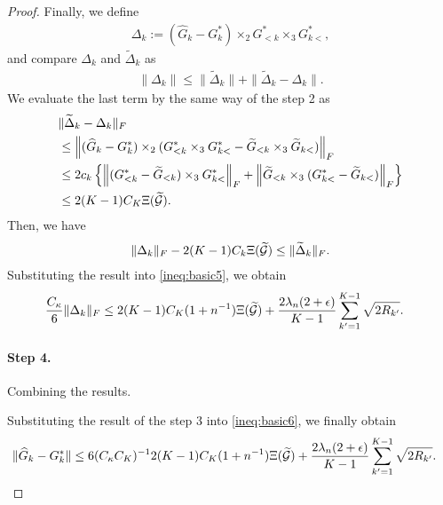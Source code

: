 \begin{proof}
Finally, we define
\begin{align*}
	\Delta_k := (\hat{G}_k - G_k^*) \times_2 G_{<k}^* \times_3 G_{k<}^*,
\end{align*}
and compare $\Delta_k$ and $\tilde{\Delta}_k$ as
\begin{align*}
	\|\Delta_k\| \leq \|\tilde{\Delta}_k\| + \|\tilde{\Delta}_k - \Delta_k\|.
\end{align*}
We evaluate the last term by the same way of the step 2 as
\begin{align*}
	&\|\widetilde{\Delta}_k - \Delta_k\|_F \\
	& \leq \left\| (\widehat{G}_k - G_k^*) \times_2 (G_{<k}^* \times_3 G_{k<}^* - \widetilde{G}_{<k} \times_3 \widetilde{G}_{k<})\right\|_F \\
	& \leq 2 c_k \left\{\left\| (G_{<k}^* - \widetilde{G}_{<k} ) \times_3 G_{k<}^*\right\|_F + \left\| \widetilde{G}_{<k} \times_3 ( G_{k<}^* -  \widetilde{G}_{k<})\right\|_F  \right\} \\
	& \leq 2 (K-1) C_K \Xi(\widetilde{\mathcal{G}}).
\end{align*}
Then, we have
\begin{align*}
	\|\Delta_k\|_F - 2 (K-1) C_k\Xi(\widetilde{\mathcal{G}}) \leq  \|\widetilde{\Delta}_k\|_F.
\end{align*}
Substituting the result into \eqref{ineq:basic5}, we obtain
\begin{align}
	&\frac{C_{\kappa}}{6} \|\Delta_k\|_F \leq   2(K-1)C_K(1+n^{-1})  \Xi(\widetilde{\mathcal{G}})  + \frac{2 \lambda_n (2+\epsilon)}{K-1}\sum_{k'=1}^{K-1} \sqrt{2R_{k'}}. \label{ineq:basic6}
\end{align}


\paragraph{Step 4.} Combining the results.


Substituting the result of the step 3 into \eqref{ineq:basic6}, we finally obtain
\begin{align*}
	&\|\widehat{G}_k - G_k^*\| \leq  6 (C_{\kappa} C_K)^{-1} 2(K-1)C_K(1+n^{-1})  \Xi(\widetilde{\mathcal{G}})  + \frac{2 \lambda_n (2+\epsilon)}{K-1}\sum_{k'=1}^{K-1} \sqrt{2R_{k'}}.
\end{align*}


\end{proof}
